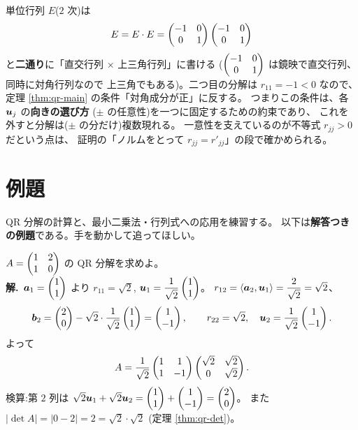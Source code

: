 \begin{hanrei}\label{hanrei:qr-sign}
単位行列 $E$($2$ 次)は
\[
E = E \cdot E
= \begin{pmatrix}-1 & 0 \\ 0 & 1\end{pmatrix}\begin{pmatrix}-1 & 0 \\ 0 & 1\end{pmatrix}
\]
と\textbf{二通り}に「直交行列 × 上三角行列」に書ける
($\begin{pmatrix}-1 & 0 \\ 0 & 1\end{pmatrix}$ は鏡映で直交行列、同時に対角行列なので
上三角でもある)。二つ目の分解は $r_{11} = -1 < 0$ なので、
定理 \ref{thm:qr-main} の条件「対角成分が正」に反する。
つまりこの条件は、各 $\bm{u}_j$ の\textbf{向きの選び方}
($\pm$ の任意性)を一つに固定するための約束であり、
これを外すと分解は($\pm$ の分だけ)複数現れる。
一意性を支えているのが不等式 $r_{jj} > 0$ だという点は、
証明の「ノルムをとって $r_{jj} = r'_{jj}$」の段で確かめられる。
\end{hanrei}

\section{例題}

QR 分解の計算と、最小二乗法・行列式への応用を練習する。
以下は\textbf{解答つきの例題}である。手を動かして追ってほしい。

\begin{rei}\label{rei:qr-basic2x2}
$A = \begin{pmatrix}1 & 2 \\ 1 & 0\end{pmatrix}$ の QR 分解を求めよ。\\
\textbf{解.}\ $\bm{a}_1 = \begin{pmatrix}1 \\ 1\end{pmatrix}$ より $r_{11} = \sqrt{2}$,
$\bm{u}_1 = \dfrac{1}{\sqrt{2}}\begin{pmatrix}1 \\ 1\end{pmatrix}$。
$r_{12} = \langle \bm{a}_2, \bm{u}_1 \rangle = \dfrac{2}{\sqrt{2}}
= \sqrt{2}$、
\[
\bm{b}_2 = \begin{pmatrix}2 \\ 0\end{pmatrix} - \sqrt{2} \cdot \frac{1}{\sqrt{2}}\begin{pmatrix}1 \\ 1\end{pmatrix}
= \begin{pmatrix}1 \\ -1\end{pmatrix}, \qquad r_{22} = \sqrt{2},\quad
\bm{u}_2 = \frac{1}{\sqrt{2}}\begin{pmatrix}1 \\ -1\end{pmatrix}.
\]
よって
\[
A = \frac{1}{\sqrt{2}}\begin{pmatrix}1 & 1 \\ 1 & -1\end{pmatrix}\begin{pmatrix}\sqrt{2} & \sqrt{2} \\ 0 & \sqrt{2}\end{pmatrix}.
\]
検算:第 $2$ 列は $\sqrt{2}\bm{u}_1 + \sqrt{2}\bm{u}_2
= \begin{pmatrix}1 \\ 1\end{pmatrix} + \begin{pmatrix}1 \\ -1\end{pmatrix} = \begin{pmatrix}2 \\ 0\end{pmatrix}$。
また $|\det A| = |0 - 2| = 2 = \sqrt{2} \cdot \sqrt{2}$
(定理 \ref{thm:qr-det})。
\end{rei}

